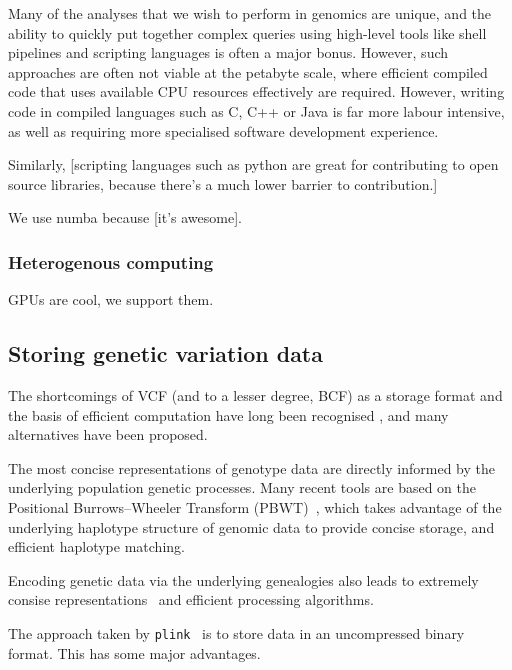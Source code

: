 \documentclass[9pt,lineno]{elife}
\newcommand{\toolname}[1]{\texttt{#1}}
\begin{document}
Many of the analyses that we wish to perform in genomics are unique,
and the ability to quickly put together complex queries using
high-level tools like shell pipelines and scripting languages
is often a major bonus. However, such approaches are often not
viable at the petabyte scale, where efficient compiled code that
uses available CPU resources effectively are required. However,
writing code in compiled languages such as C, C++ or Java
is far more labour intensive, as well as requiring more specialised
software development experience.

Similarly, [scripting languages such as python are great for
contributing to open source libraries, because there's a much
lower barrier to contribution.]

We use numba because [it's awesome].

\subsubsection{Heterogenous computing}

GPUs are cool, we support them.


\subsection{Storing genetic variation data}
The shortcomings of VCF (and to a lesser degree, BCF) as a storage
format and the basis of efficient computation have long been
recognised \citep[e.g.][]{kelleher2013processing,layer2016efficient,li2016bgt},
and many alternatives
have been proposed.

The most concise representations of genotype data are directly
informed by the underlying population genetic processes.
Many recent tools are based on the Positional Burrows--Wheeler
Transform (PBWT)~\citep{durbin2014efficient}, which takes advantage
of the underlying haplotype structure of genomic data to provide
concise storage, and efficient haplotype matching.


\citep{layer2016efficient}
\citep{li2016bgt}



Encoding genetic data via the underlying genealogies also
leads to extremely consise representations~\citep{kelleher2019inferring}
and efficient processing algorithms.


The approach taken by \toolname{plink}~\citep{purcell2007plink} is to
store data in an uncompressed binary format. This has some major
advantages.
\end{document}
